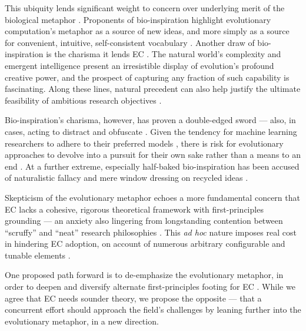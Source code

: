 This ubiquity lends significant weight to concern over underlying merit of the biological metaphor \citep{moore2023evolution}.
Proponents of bio-inspiration highlight evolutionary computation's metaphor as a source of new ideas, and more simply as a source for convenient, intuitive, self-consistent vocabulary \citep{sorensen2013metaheuristics,banzhaf2006artificial}.
Another draw of bio-inspiration is the charisma it lends EC \citep{lehman2020surprising}.
The natural world's complexity and emergent intelligence present an irresistible display of evolution's profound creative power, and the prospect of capturing any fraction of such capability is fascinating.
Along these lines, natural precedent can also help justify the ultimate feasibility of ambitious research objectives \citep{miikkulainen2021biological,banzhaf2006artificial}.

Bio-inspiration's charisma, however, has proven a double-edged sword --- also, in cases, acting to distract and obfuscate \citep{moore2023evolution,sorensen2013metaheuristics,aranha2021metaphorbased,campelo2023lessons}.
Given the tendency for machine learning researchers to adhere to their preferred models \citep{domingos2012few}, there is risk for evolutionary approaches to devolve into a pursuit for their own sake rather than a means to an end \citep{woodward2016gp,yampolskiy2018why,michalewicz2012quo}.
At a further extreme, especially half-baked bio-inspiration has been accused of naturalistic fallacy and mere window dressing on recycled ideas \citep{wortmann2020does,sorensen2013metaheuristics,simon2011analytical,campelo2023lessons,camachovillaln2022exposing,tzanetos2020nature,lones2019mitigating,delser2019bioinspired,fister2016new}.

Skepticism of the evolutionary metaphor echoes a more fundamental concern that EC lacks a cohesive, rigorous theoretical framework with first-principles grounding \citep{worzel2003genetic} --- an anxiety also lingering from longstanding contention between ``scruffy'' and ``neat'' research philosophies \citep[p.~16]{jones2008artificial, minsky1991logical}.
This \textit{ad hoc} nature imposes real cost in hindering EC adoption, on account of numerous arbitrary configurable and tunable elements \citep{oneil2010open}.

One proposed path forward is to de-emphasize the evolutionary metaphor, in order to deepen and diversify alternate first-principles footing for EC \citep{moore2023evolution}.
While we agree that EC needs sounder theory, we propose the opposite --- that a concurrent effort should approach the field's challenges by leaning further into the evolutionary metaphor, in a new direction.

